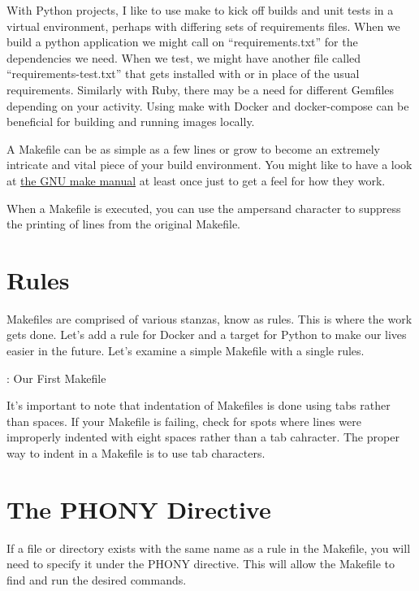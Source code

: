 \justify{}
With Python projects, I like to use make to kick off builds and unit tests in a virtual environment, perhaps with differing sets of requirements files. When we build a python application we might call on ``requirements.txt'' for the dependencies we need. When we test, we might have another file called ``requirements-test.txt'' that gets installed with or in place of the usual requirements. Similarly with Ruby, there may be a need for different Gemfiles depending on your activity. Using make with Docker and docker-compose can be beneficial for building and running images locally. 

\justify{}
A Makefile can be as simple as a few lines or grow to become an extremely intricate and vital piece of your
build environment. You might like to have a look at 
\href{https://www.gnu.org/software/make/manual/make.html#Introduction}{the GNU make manual} at least once just to get a feel for how they work.

\justify{}
When a Makefile is executed, you can use the ampersand character to suppress the printing of lines from the original Makefile.

\section{Rules}

\justify{}
Makefiles are comprised of various stanzas, know as rules. This is where the work gets done. Let's add a rule
for Docker and a target for Python to make our lives easier in the future. Let's examine a simple Makefile with a single rules.

\justify{}
\begin{mybox}{\thetcbcounter: Our First Makefile}
	
\end{mybox}

\justify{}
It's important to note that indentation of Makefiles is done using tabs rather than spaces. If your Makefile is failing, check for spots where lines were improperly
indented with eight spaces rather than a tab cahracter. The proper way to indent in a Makefile is to use tab characters.

\section{The PHONY Directive}

\justify{}
If a file or directory exists with the same name as a rule in the Makefile, you will need to specify
it under the PHONY directive. This will allow the Makefile to find and run the desired commands.

